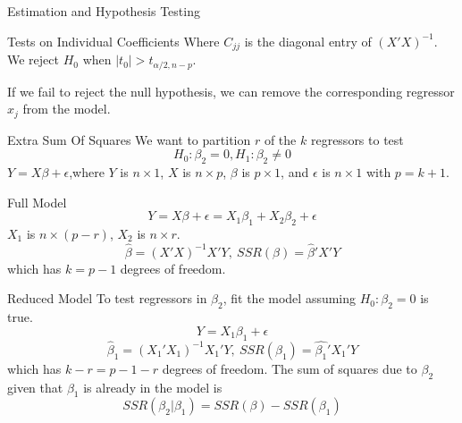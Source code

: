 \documentclass{article}
\begin{document}
\begin{multicols*}{3}
\begin{blackbox}{Estimation and Hypothesis Testing}
\begin{bluebox}{Tests on Individual Coefficients}
            Where $C_{jj}$ is the diagonal entry of $(X'X)^{-1}$. We reject $H_0$ when $|t_0| > t_{\alpha/2, n-p}$.
        \end{bluebox}
        If we fail to reject the null hypothesis, we can remove the corresponding regressor $x_j$ from the model.
    \end{blackbox}
    \begin{blackbox}{Extra Sum Of Squares}
        We want to partition $r$ of the $k$ regressors to test \\[-2ex]
        \[H_0: \beta_2 = 0, H_1: \beta_2 \neq 0\]
        $Y = X\beta + \epsilon$,where $Y$ is $n\times 1$, $X$ is $n\times p$, $\beta$ is $p\times 1$, and $\epsilon$ is $n \times 1$ with $p = k+1$.
        \begin{redbox}{Full Model}
            \[Y = X\beta + \epsilon = X_1\beta_1 + X_2\beta_2 + \epsilon\] 
            $X_1$ is $n \times (p-r)$, $X_2$ is $n\times r$.\\[-2ex]
           \[\hat{\beta} = (X'X)^{-1}X'Y, \ SSR(\beta) = \hat{\beta}'X'Y\]
           which has $k = p-1$ degrees of freedom.
        \end{redbox}
        \begin{brownbox}{Reduced Model}
            To test regressors in $\beta_2$, fit the model assuming $H_0: \beta_2 = 0$ is true. \\[-3ex]
            \[Y = X_1\beta_1 + \epsilon\]
            \[\hat{\beta}_1 = (X_1'X_1)^{-1}X_1'Y, \ SSR(\beta_1) = \hat{\beta_1}'X_1'Y\]
            which has $k-r = p - 1 - r$ degrees of freedom. The sum of squares due to $\beta_2$ given that $\beta_1$ is already in the model is \\[-3ex]
            \[SSR(\beta_2 | \beta_1) = SSR(\beta) - SSR(\beta_1)\]
        \end{brownbox}
            

\end{blackbox}
\end{multicols*}
\end{document}
